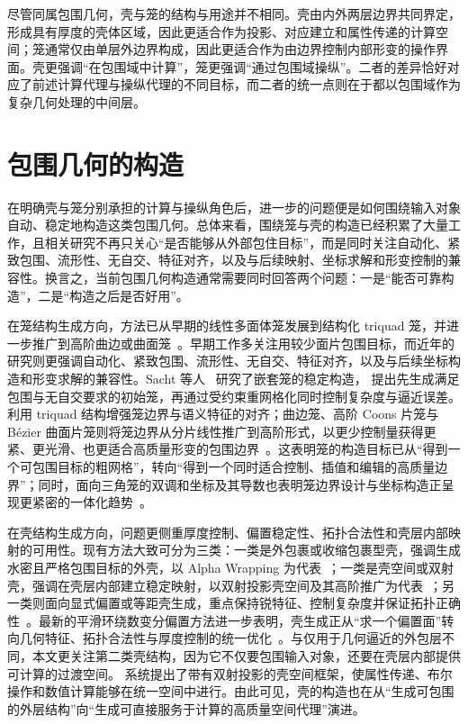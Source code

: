 尽管同属包围几何，壳与笼的结构与用途并不相同。壳由内外两层边界共同界定，形成具有厚度的壳体区域，因此更适合作为投影、对应建立和属性传递的计算空间；笼通常仅由单层外边界构成，因此更适合作为由边界控制内部形变的操作界面。壳更强调“在包围域中计算”，笼更强调“通过包围域操纵”。二者的差异恰好对应了前述计算代理与操纵代理的不同目标，而二者的统一点则在于都以包围域作为复杂几何处理的中间层。

\section{包围几何的构造}

在明确壳与笼分别承担的计算与操纵角色后，进一步的问题便是如何围绕输入对象自动、稳定地构造这类包围几何。总体来看，围绕笼与壳的构造已经积累了大量工作，且相关研究不再只关心“是否能够从外部包住目标”，而是同时关注自动化、紧致包围、流形性、无自交、特征对齐，以及与后续映射、坐标求解和形变控制的兼容性。换言之，当前包围几何构造通常需要同时回答两个问题：一是“能否可靠构造”，二是“构造之后是否好用”。

在笼结构生成方向，方法已从早期的线性多面体笼发展到结构化 triquad 笼，并进一步推广到高阶曲边或曲面笼~\cite{Stroter2024CageSurvey}。早期工作多关注用较少面片包围目标，而近年的研究则更强调自动化、紧致包围、流形性、无自交、特征对齐，以及与后续坐标构造和形变求解的兼容性。Sacht 等人~\cite{Sacht2015} 研究了嵌套笼的稳定构造，\citet{Guo2024RobustCage} 提出先生成满足包围与无自交要求的初始笼，再通过受约束重网格化同时控制复杂度与逼近误差。\citet{Thiery2022TriquadGC} 利用 triquad 结构增强笼边界与语义特征的对齐；曲边笼、高阶 Coons 片笼与 B{\'e}zier 曲面片笼则将笼边界从分片线性推广到高阶形式，以更少控制量获得更紧、更光滑、也更适合高质量形变的包围边界~\cite{Lin2024PolynomialCC,Qin2024Coons,Xiao2025BezierCage}。这表明笼的构造目标已从“得到一个可包围目标的粗网格”，转向“得到一个同时适合控制、插值和编辑的高质量边界”；同时，面向三角笼的双调和坐标及其导数也表明笼边界设计与坐标构造正呈现更紧密的一体化趋势~\cite{thiery2024biharmonic}。

在壳结构生成方向，问题更侧重厚度控制、偏置稳定性、拓扑合法性和壳层内部映射的可用性。现有方法大致可分为三类：一类是外包裹或收缩包裹型壳，强调生成水密且严格包围目标的外壳，以 Alpha Wrapping 为代表~\cite{Portaneri2022AlphaWrapping}；一类是壳空间或双射壳，强调在壳层内部建立稳定映射，以双射投影壳空间及其高阶推广为代表~\cite{Jiang2020BijectivePI,liu2024curveshell}；另一类则面向显式偏置或等距壳生成，重点保持锐特征、控制复杂度并保证拓扑正确性~\cite{Wang2024PCO,Zint2025TopologicalOffsets}。最新的平滑环绕数变分偏置方法进一步表明，壳生成正从“求一个偏置面”转向几何特征、拓扑合法性与厚度控制的统一优化~\cite{Sun2026VariationalMeshOffsetting}。与仅用于几何逼近的外包层不同，本文更关注第二类壳结构，因为它不仅要包围输入对象，还要在壳层内部提供可计算的过渡空间。\citet{Jiang2020BijectivePI} 系统提出了带有双射投影的壳空间框架，使属性传递、布尔操作和数值计算能够在统一空间中进行。由此可见，壳的构造也在从“生成可包围的外层结构”向“生成可直接服务于计算的高质量空间代理”演进。


